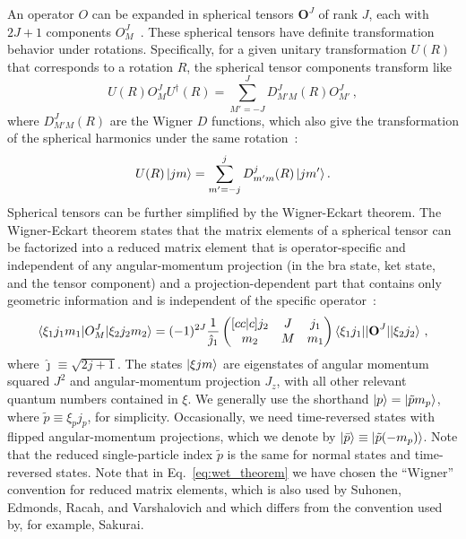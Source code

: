 An operator $O$ can be expanded in spherical tensors $\mathbf{O}^{J}$ of rank $J$,
each with $2 J + 1$ components $O^{J}_{M}$~\cite{Suho07angmom}.
These spherical tensors have definite transformation behavior
under rotations.
Specifically, for a given unitary transformation $U(R)$
that corresponds to a rotation $R$,
the spherical tensor components transform like~\cite{Suho07angmom}
\begin{equation}
  U(R)O^{J}_{M}U^{\dagger}(R) = \sum_{M'=-J}^{J} D^{J}_{M'M}(R) O_{M'}^{J}\,,
\end{equation}
where $D^{J}_{M'M}(R)$ are the Wigner $D$ functions,
which also give the transformation of the spherical harmonics under the same rotation~\cite{Suho07angmom}:
\begin{equation}
  U(R)\ket{j m} = \sum_{m' = -j}^{j} D_{m' m}^{j}(R) \ket{j m'}.
\end{equation}
Spherical tensors can be further simplified by the Wigner-Eckart theorem.
The Wigner-Eckart theorem states
that the matrix elements of a spherical tensor
can be factorized into
a reduced matrix element that is operator-specific
and independent of any angular-momentum projection
(in the bra state, ket state, and the tensor component)
and a projection-dependent part
that contains only geometric information
and is independent of the specific operator~\cite{Wign27wet,Ecka30wet}:
\begin{equation}\label{eq:wet_theorem}
  \braket{\xi_1 j_1 m_1 | O^{J}_{M} | \xi_2 j_2 m_2 }
  = (-1 )^{2J} \frac{1}{\hat{\jmath}_1}
  \begin{pmatrix}[cc|c] j_2 & J & j_1 \\ m_2 & M & m_1 \end{pmatrix}
  \braket{\xi_1 j_1 || \textbf{O}^{J} || \xi_2 j_2}\,,
\end{equation}
where $\hat{\jmath} \equiv \sqrt{2 j + 1}$.
The states $\ket{\xi j m}$
are eigenstates of
angular momentum squared $J^2$
and angular-momentum projection $J_{z}$,
with all other relevant quantum numbers
contained in $\xi$.
We generally use the shorthand $\ket{p} = \ket{\tilde{p} m_p}$,
where $\tilde{p} \equiv \xi_p j_p$, for simplicity.
Occasionally, we need time-reversed states
with flipped angular-momentum projections,
which we denote by $\ket{\bar{p}} \equiv \ket{\tilde{p} (-m_p)}$.
Note that the reduced single-particle index $\tilde{p}$ is the same
for normal states and time-reversed states.
Note that in Eq.~\eqref{eq:wet_theorem}
we have chosen the ``Wigner'' convention for reduced matrix elements,
which is also used by Suhonen, Edmonds, Racah, and Varshalovich
and which differs from the convention used by, for example, Sakurai.

